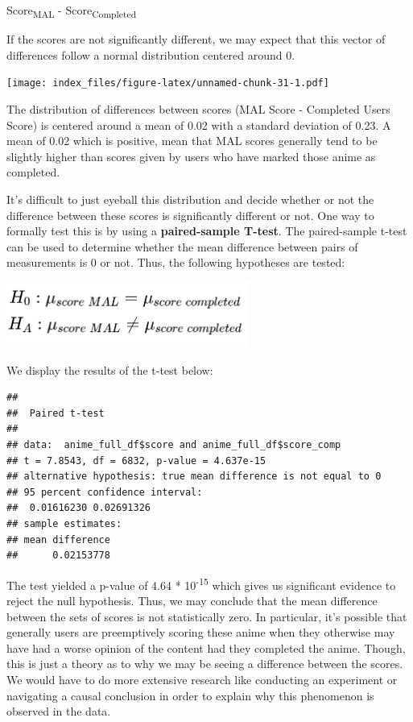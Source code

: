 \documentclass[
]{article}
\begin{document}
Score\textsubscript{MAL} - Score\textsubscript{Completed}

If the scores are not significantly different, we may expect that this
vector of differences follow a normal distribution centered around 0.

\texttt{[image: index\_files/figure-latex/unnamed-chunk-31-1.pdf]}

The distribution of differences between scores (MAL Score - Completed
Users Score) is centered around a mean of 0.02 with a standard deviation
of 0.23. A mean of 0.02 which is positive, mean that MAL scores
generally tend to be slightly higher than scores given by users who have
marked those anime as completed.

It's difficult to just eyeball this distribution and decide whether or
not the difference between these scores is significantly different or
not. One way to formally test this is by using a \textbf{paired-sample
T-test}. The paired-sample t-test can be used to determine whether the
mean difference between pairs of measurements is 0 or not. Thus, the
following hypotheses are tested:

\begin{center}\includegraphics[width=300px]{img/score_t_test} \end{center}

We display the results of the t-test below:

\begin{verbatim}
## 
##  Paired t-test
## 
## data:  anime_full_df$score and anime_full_df$score_comp
## t = 7.8543, df = 6832, p-value = 4.637e-15
## alternative hypothesis: true mean difference is not equal to 0
## 95 percent confidence interval:
##  0.01616230 0.02691326
## sample estimates:
## mean difference 
##      0.02153778
\end{verbatim}

The test yielded a p-value of 4.64 * 10\textsuperscript{-15} which gives
us significant evidence to reject the null hypothesis. Thus, we may
conclude that the mean difference between the sets of scores is not
statistically zero. In particular, it's possible that generally users
are preemptively scoring these anime when they otherwise may have had a
worse opinion of the content had they completed the anime. Though, this
is just a theory as to why we may be seeing a difference between the
scores. We would have to do more extensive research like conducting an
experiment or navigating a causal conclusion in order to explain why
this phenomenon is observed in the data.
\end{document}
